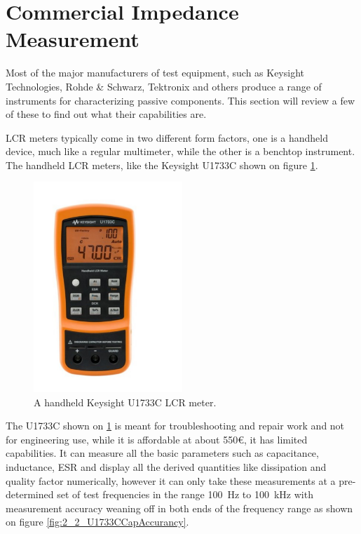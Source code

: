 \section{Commercial Impedance Measurement} \label{sec:CommercialImpedanceMeasurement}
Most of the major manufacturers of test equipment, such as Keysight Technologies, Rohde \& Schwarz, Tektronix and others produce a range of instruments for characterizing passive components. This section will review a few of these to find out what their capabilities are. 

LCR meters typically come in two different form factors, one is a handheld device, much like a regular multimeter, while the other is a benchtop instrument. The handheld LCR meters, like the Keysight U1733C\cite{KeysightU1733C} shown on figure \ref{fig:2_2_U1733C}.
\begin{figure}[H]
    \centering
    \includegraphics[clip, trim=0 50 0 50, width=0.5\textwidth]{Sections/2_ProblemAnalysis/FIgures/KeysightU1733C.pdf}
    \caption{A handheld Keysight U1733C LCR meter.\cite{KeysightU1733C}}
    \label{fig:2_2_U1733C}
\end{figure}
The U1733C shown on \ref{fig:2_2_U1733C} is meant for troubleshooting and repair work and not for engineering use, while it is affordable at about 550€, it has limited capabilities. It can measure all the basic parameters such as capacitance, inductance, ESR and display all the derived quantities like dissipation and quality factor numerically, however it can only take these measurements at a pre-determined set of test frequencies in the range \SI[]{100}{\hertz} to \SI[]{100}{\kilo\hertz} with measurement accuracy weaning off in both ends of the frequency range as shown on figure \ref{fig:2_2_U1733CCapAccurancy}.

